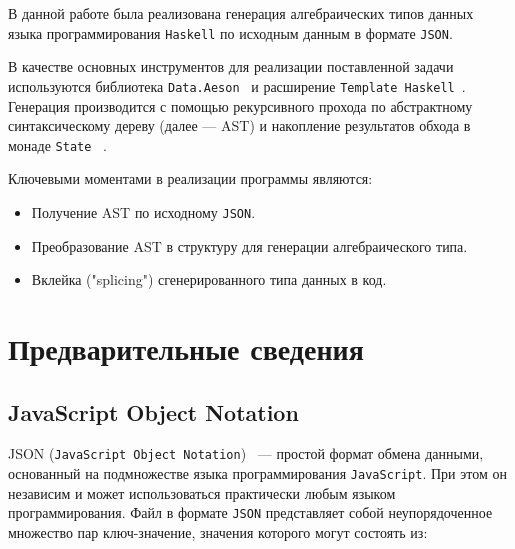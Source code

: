


\graphicspath{ {img/} }




\Intro
В данной работе была реализована генерация алгебраических типов данных языка программирования \lstinline{Haskell} 
по исходным данным в формате \lstinline{JSON}.

В качестве основных инструментов для реализации поставленной задачи используются 
библиотека \lstinline{Data.Aeson}~\cite{aeson} и расширение \lstinline{Template Haskell}~\cite{tempHaskell}. Генерация 
производится с помощью рекурсивного прохода по абстрактному синтаксическому дереву (далее --- AST) и 
накопление результатов обхода в монаде \lstinline{State} ~\cite{stateM}.

Ключевыми моментами в реализации программы являются:

\begin{itemize}
  \item Получение AST по исходному \lstinline{JSON}.
  \item Преобразование AST в структуру для генерации алгебраического типа.
  \item Вклейка ("splicing") сгенерированного типа данных в код.
\end{itemize}

\chapter{Предварительные сведения}

\section{JavaScript Object Notation}

JSON (\lstinline{JavaScript Object Notation})~\cite{jsonStandart} --- простой формат обмена данными, основанный на подмножестве языка программирования \lstinline{JavaScript}. При этом он независим и может использоваться практически любым языком программирования. Файл в формате \lstinline{JSON} представляет собой неупорядоченное множество пар ключ-значение, значения которого могут состоять из:  

